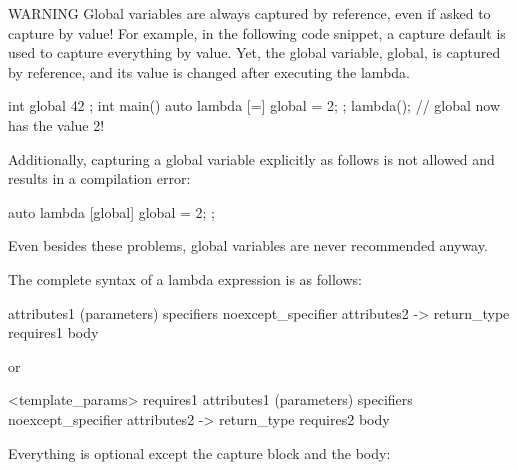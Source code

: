 \begin{myWarning}{WARNING}
Global variables are always captured by reference, even if asked to capture by value! For example, in the following code snippet, a capture default is used to capture everything by value. Yet, the global variable, global, is captured by reference, and its value is changed after executing the lambda.

\begin{cpp}
int global { 42 };
int main()
{
    auto lambda { [=] { global = 2; } };
    lambda();
    // global now has the value 2!
}
\end{cpp}

Additionally, capturing a global variable explicitly as follows is not allowed and results in a compilation error:

\begin{cpp}
auto lambda { [global] { global = 2; } };
\end{cpp}

Even besides these problems, global variables are never recommended anyway.
\end{myWarning}

The complete syntax of a lambda expression is as follows:

\begin{cpp}
 attributes1 (parameters) specifiers noexcept_specifier attributes2
    -> return_type requires1 {body}
\end{cpp}

or

\begin{cpp}
 <template_params> requires1 attributes1 (parameters) specifiers
    noexcept_specifier attributes2 -> return_type requires2 {body}
\end{cpp}

Everything is optional except the capture block and the body:

